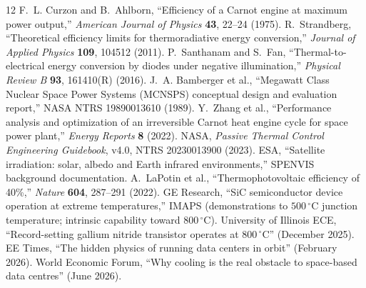\documentclass[11pt]{article}
\theoremstyle{definition}
\theoremstyle{remark}
\begin{document}
\begin{thebibliography}{12}
 F.~L. Curzon and B.~Ahlborn, ``Efficiency of a Carnot engine at maximum power output,'' \emph{American Journal of Physics} \textbf{43}, 22--24 (1975).
 R.~Strandberg, ``Theoretical efficiency limits for thermoradiative energy conversion,'' \emph{Journal of Applied Physics} \textbf{109}, 104512 (2011).
 P.~Santhanam and S.~Fan, ``Thermal-to-electrical energy conversion by diodes under negative illumination,'' \emph{Physical Review B} \textbf{93}, 161410(R) (2016).
 J.~A. Bamberger et al., ``Megawatt Class Nuclear Space Power Systems (MCNSPS) conceptual design and evaluation report,'' NASA NTRS 19890013610 (1989).
 Y.~Zhang et al., ``Performance analysis and optimization of an irreversible Carnot heat engine cycle for space power plant,'' \emph{Energy Reports} \textbf{8} (2022).
 NASA, \emph{Passive Thermal Control Engineering Guidebook}, v4.0, NTRS 20230013900 (2023).
 ESA, ``Satellite irradiation: solar, albedo and Earth infrared environments,'' SPENVIS background documentation.
 A.~LaPotin et al., ``Thermophotovoltaic efficiency of 40\%,'' \emph{Nature} \textbf{604}, 287--291 (2022).
 GE Research, ``SiC semiconductor device operation at extreme temperatures,'' IMAPS (demonstrations to $500\,^{\circ}$C junction temperature; intrinsic capability toward $800\,^{\circ}$C).
 University of Illinois ECE, ``Record-setting gallium nitride transistor operates at $800\,^{\circ}$C'' (December 2025).
 EE Times, ``The hidden physics of running data centers in orbit'' (February 2026).
 World Economic Forum, ``Why cooling is the real obstacle to space-based data centres'' (June 2026).
\end{thebibliography}
\end{document}
